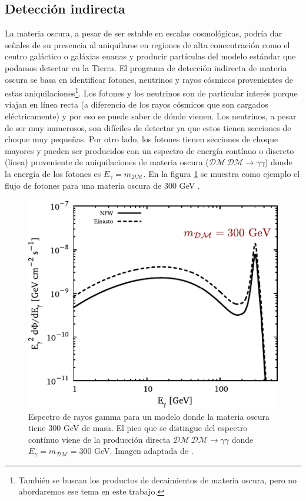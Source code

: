 \subsection[\hspace{-0.4in}) Detección indirecta]{Detección indirecta}
La materia oscura, a pesar de ser estable en escalas cosmológicas, podría dar señales de su presencia al aniquilarse en regiones de alta concentración como el centro galáctico o galáxias enanas y producir partículas del modelo estándar que podamos detectar en la Tierra. El programa de detección indirecta de materia oscura se basa en identificar fotones, neutrinos y rayos cósmicos provenientes de estas aniquilaciones\footnote{También se buscan los productos de decaimientos de materia oscura, pero no abordaremos ese tema en este trabajo.}. Los fotones y los neutrinos son de particular interés porque viajan en línea recta (a diferencia de los rayos cósmicos que son cargados eléctricamente) y por eso se puede saber de dónde vienen. Los neutrinos, a pesar de ser muy numerosos, son difíciles de detectar ya que estos tienen secciones de choque muy pequeñas. Por otro lado, los fotones tienen secciones de choque mayores y pueden ser producidos con un espectro de energía contínuo o discreto (línea) proveniente de aniquilaciones de materia oscura ($\mathcal{DM}\, \mathcal{DM} \to \gamma \gamma$) donde la energía de los fotones es $E_\gamma = m_\mathcal{DM}$. En la figura \ref{fig:g_Servant} se muestra como ejemplo el flujo de fotones para una materia oscura de 300 GeV \cite{Jackson:2013pjq}.
\begin{figure}[h]
\centering
\includegraphics[scale=1]{Images/fig_Servant.pdf}
\caption[Espectro de rayos gamma (línea)]{Espectro de rayos gamma para un modelo donde la materia oscura tiene 300 GeV de masa. El pico que se distingue del espectro contínuo viene de la producción directa $\mathcal{DM}\, \mathcal{DM} \to \gamma \gamma$ donde $E_\gamma = m_\mathcal{DM} =300$ GeV. Imagen adaptada de \cite{Jackson:2013pjq}.}
\label{fig:g_Servant}
\end{figure}

